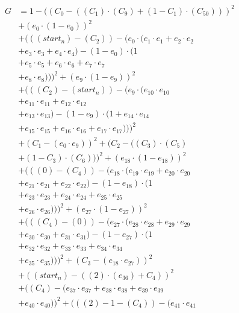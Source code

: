 \documentclass[10pt, a4paper]{article}
\begin{document}
\begin{small}
\begin{align*}
G &= 1 - ((C_{0} - ((C_{1})  \cdot  (C_{9}) + (1 - C_{1})  \cdot  (C_{50})))^{2} \\
& + (e_{0} \cdot (1 - e_{0}))^{2} \\
& + (((start_n) - (C_{2})) - (e_{0} \cdot (e_{1} \cdot e_{1} + e_{2} \cdot e_{2} \\
& + e_{3} \cdot e_{3} + e_{4} \cdot e_{4}) - (1 - e_{0}) \cdot (1 \\
& + e_{5} \cdot e_{5} + e_{6} \cdot e_{6} + e_{7} \cdot e_{7} \\
& + e_{8} \cdot e_{8})))^{2} + (e_{9} \cdot (1 - e_{9}))^{2} \\
& + (((C_{2}) - (start_n)) - (e_{9} \cdot (e_{10} \cdot e_{10} \\
& + e_{11} \cdot e_{11} + e_{12} \cdot e_{12} \\
& + e_{13} \cdot e_{13}) - (1 - e_{9}) \cdot (1 + e_{14} \cdot e_{14} \\
& + e_{15} \cdot e_{15} + e_{16} \cdot e_{16} + e_{17} \cdot e_{17})))^{2} \\
& + (C_{1} - (e_{0} \cdot e_{9}))^{2} + (C_{2} - ((C_{3})  \cdot  (C_{5}) \\
& + (1 - C_{3})  \cdot  (C_{6})))^{2} + (e_{18} \cdot (1 - e_{18}))^{2} \\
& + (((0) - (C_{4})) - (e_{18} \cdot (e_{19} \cdot e_{19} + e_{20} \cdot e_{20} \\
& + e_{21} \cdot e_{21} + e_{22} \cdot e_{22}) - (1 - e_{18}) \cdot (1 \\
& + e_{23} \cdot e_{23} + e_{24} \cdot e_{24} + e_{25} \cdot e_{25} \\
& + e_{26} \cdot e_{26})))^{2} + (e_{27} \cdot (1 - e_{27}))^{2} \\
& + (((C_{4}) - (0)) - (e_{27} \cdot (e_{28} \cdot e_{28} + e_{29} \cdot e_{29} \\
& + e_{30} \cdot e_{30} + e_{31} \cdot e_{31}) - (1 - e_{27}) \cdot (1 \\
& + e_{32} \cdot e_{32} + e_{33} \cdot e_{33} + e_{34} \cdot e_{34} \\
& + e_{35} \cdot e_{35})))^{2} + (C_{3} - (e_{18} \cdot e_{27}))^{2} \\
& + ((start_n) - ((2)  \cdot  (e_{36}) + C_{4}))^{2} \\
& + ((C_{4}) - (e_{37} \cdot e_{37} + e_{38} \cdot e_{38} + e_{39} \cdot e_{39} \\
& + e_{40} \cdot e_{40}))^{2} + (((2) - 1 - (C_{4})) - (e_{41} \cdot e_{41} \\

\end{align*}
\end{small}
\end{document}
